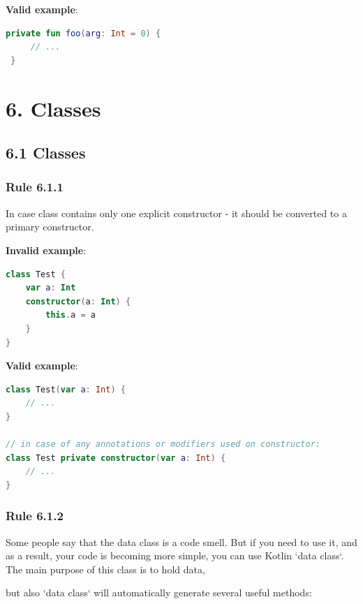 {{{{\textbf{Valid example}:

\begin{lstlisting}[language=Kotlin]
 private fun foo(arg: Int = 0) {
     // ...
 }
\end{lstlisting}
\section*{\textbf{6. Classes}}

\subsection*{\textbf{6.1 Classes}}

\subsubsection*{\textbf{Rule 6.1.1}}
\leavevmode\newline

In case class contains only one explicit constructor - it should be converted to a primary constructor.



\textbf{Invalid example}:

\begin{lstlisting}[language=Kotlin]
class Test {
    var a: Int
    constructor(a: Int) {
        this.a = a
    }
}
\end{lstlisting}


\textbf{Valid example}:

\begin{lstlisting}[language=Kotlin]
class Test(var a: Int) {
    // ...
}

// in case of any annotations or modifiers used on constructor:
class Test private constructor(var a: Int) {
    // ...
}
\end{lstlisting}


\subsubsection*{\textbf{Rule 6.1.2}}
\leavevmode\newline

Some people say that the data class is a code smell. But if you need to use it, and as a result, your code is becoming more simple, you can use Kotlin `data class`. The main purpose of this class is to hold data,

but also `data class` will automatically generate several useful methods:

}}}}
